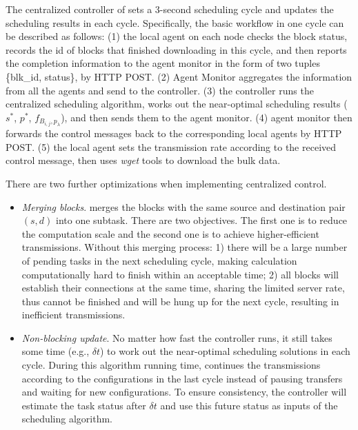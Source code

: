 The centralized controller of \name sets a 3-second scheduling cycle and updates the scheduling results in each cycle. Specifically, the basic workflow in one cycle can be described as follows: (1) the local agent on each node checks the block status, records the id of blocks that finished downloading in this cycle, and then reports the completion information to the agent monitor in the form of two tuples \{blk\_id, status\}, by HTTP POST. (2) Agent Monitor aggregates the information from all the agents and send to the controller. (3) the controller runs the centralized scheduling algorithm, works out the near-optimal scheduling results ($s^*$, $p^*$, $f_{B_{i,j},p_\lambda}$), and then sends them to the agent monitor. (4) agent monitor then forwards the control messages back to the corresponding local agents by HTTP POST. (5) the local agent sets the transmission rate according to the received control message, then uses \emph{wget} tools to download the bulk data.

There are two further optimizations when implementing centralized control.
\begin{itemize}
\item \emph{Merging blocks}. \name merges the blocks with the same source and destination pair $(s,d)$ into one subtask. There are two objectives. The first one is to reduce the computation scale and the second one is to achieve higher-efficient transmissions. Without this merging process: 1) there will be a large number of pending tasks in the next scheduling cycle, making calculation computationally hard to finish within an acceptable time; 2) all blocks will establish their connections at the same time, sharing the limited server rate, thus cannot be finished and will be hung up for the next cycle, resulting in inefficient transmissions.%
\item \emph{Non-blocking update}. No matter how fast the controller runs, it still takes some time (e.g., $\delta t$) to work out the near-optimal scheduling solutions in each cycle. During this algorithm running time, \name continues the transmissions according to the configurations in the last cycle instead of pausing transfers and waiting for new configurations. To ensure consistency, the controller will estimate the task status after $\delta t$ and use this future status as inputs of the scheduling algorithm.
\end{itemize}

